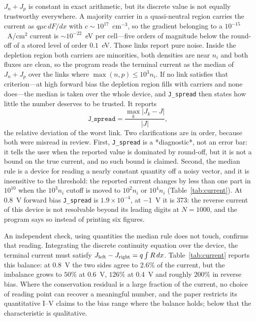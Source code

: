 \documentclass[preprint,12pt]{elsarticle}
\begin{document}
$J_n+J_p$ is constant in exact arithmetic, but its discrete value is not
equally trustworthy everywhere. A majority carrier in a quasi-neutral region
carries the current as $q\mu c\,dF/dx$ with $c\sim10^{17}$~cm$^{-3}$, so the
gradient belonging to a $10^{-15}$~A/cm$^2$ current is $\sim10^{-22}$~eV per
cell---five orders of magnitude below the round-off of a stored level of order
$0.1$~eV. Those links report pure noise. Inside the depletion region both
carriers are minorities, both densities are near $n_i$ and both fluxes are
clean, so the program reads the terminal current as the median of $J_n+J_p$
over the links where $\max(n,p)\le10^{3}n_i$. If no link satisfies that
criterion---at high forward bias the depletion region fills with carriers and
none does---the median is taken over the whole device, and
\texttt{J\_spread} then states how little the number deserves to be trusted.
It reports
\begin{equation}
  \texttt{J\_spread} = \frac{\max_k|J_k-J|}{|J|},
  \label{eq:spread}
\end{equation}
the relative deviation of the worst link. Two clarifications are in order,
because both were misread in review. First, \texttt{J\_spread} is a
*diagnostic*, not an error bar: it tells the user when the reported value is
dominated by round-off, but it is not a bound on the true current, and no
such bound is claimed. Second, the median rule is a device for reading a
nearly constant quantity off a noisy vector, and it is insensitive to the
threshold: the reported current changes by less than one part in $10^{10}$
when the $10^{3}n_i$ cutoff is moved to $10^{2}n_i$ or $10^{4}n_i$
(Table~\ref{tab:current}). At \SI{0.8}{V} forward bias \texttt{J\_spread} is
$1.9\times10^{-4}$, at \SI{-1}{V} it is $373$: the reverse current of this
device is not resolvable beyond its leading digits at $N=1000$, and the
program says so instead of printing six figures.

An independent check, using quantities the median rule does not touch,
confirms that reading. Integrating the discrete continuity equation over the
device, the terminal current must satisfy
$J_{\rm left}-J_{\rm right}=q\int R\,dx$. Table~\ref{tab:current} reports
this balance: at \SI{0.8}{V} the two sides agree to $2.6\%$ of the current,
but the imbalance grows to $50\%$ at \SI{0.6}{V}, $126\%$ at \SI{0.4}{V} and
roughly $200\%$ in reverse bias. Where the conservation residual is a large
fraction of the current, no choice of reading point can recover a meaningful
number, and the paper restricts its quantitative I--V claims to the bias
range where the balance holds; below that the characteristic is qualitative.
\end{document}
